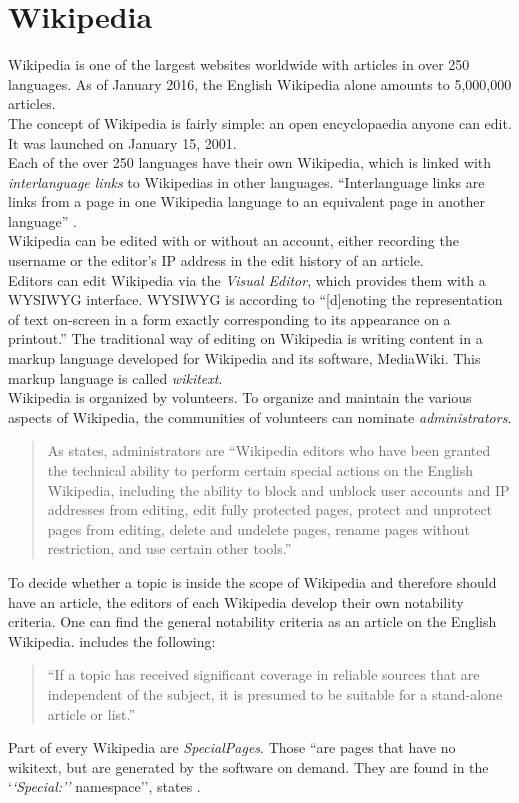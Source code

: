 \section{Wikipedia}
Wikipedia is one of the largest websites worldwide with articles in over 250 languages. As of January 2016, the English Wikipedia alone amounts to 5,000,000 articles. \citep{wiki:32} \\
The concept of Wikipedia is fairly simple: an open encyclopaedia anyone can edit. It was launched on January 15, 2001. \citep{wiki:31} \\
Each of the over 250 languages have their own Wikipedia, which is linked with \textit{interlanguage links} to Wikipedias in other languages. ``Interlanguage links are links from a page in one Wikipedia language to an equivalent page in another language'' \citep{wiki:39}. \\
Wikipedia can be edited with or without an account, either recording the username or the editor's IP address in the edit history of an article. \\
Editors can edit Wikipedia via the \textit{Visual Editor}, which provides them with a WYSIWYG interface. WYSIWYG is according to \citet{wysiwyg} ``[d]enoting the representation of text on-screen in a form exactly corresponding to its appearance on a printout.'' The traditional way of editing on Wikipedia is writing content in a markup language developed for Wikipedia and its software, MediaWiki. This markup language is called \textit{wikitext}. \\
Wikipedia is organized by volunteers. To organize and maintain the various aspects of Wikipedia, the communities of volunteers can nominate \textit{administrators}.
\begin{quote}
	As \citet{wiki:10} states, administrators are ``Wikipedia editors who have been granted the technical ability to perform certain special actions on the English Wikipedia, including the ability to block and unblock user accounts and IP addresses from editing, edit fully protected pages, protect and unprotect pages from editing, delete and undelete pages, rename pages without restriction, and use certain other tools.''
\end{quote}

To decide whether a topic is inside the scope of Wikipedia and therefore should have an article, the editors of each Wikipedia develop their own notability criteria. One can find the general notability criteria as an article on the English Wikipedia. \citet{wiki:11} includes the following: 
\begin{quote}
 ``If a topic has received significant coverage in reliable sources that are independent of the subject, it is presumed to be suitable for a stand-alone article or list.''
\end{quote}

Part of every Wikipedia are \textit{SpecialPages}. Those ``are pages that have no wikitext, but are generated by the software on demand. They are found in the `\textit{`Special:''} namespace'', states \citet{wiki:12}.

